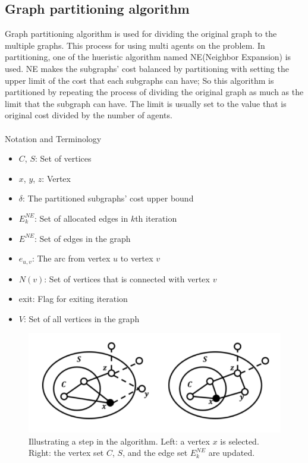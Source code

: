 \documentclass{article}
\begin{document}
\subsection{Graph partitioning algorithm}
Graph partitioning algorithm is used for dividing the original graph to the multiple graphs. This process for using multi agents on the problem. In partitioning, one of the hueristic algorithm named NE(Neighbor Expansion)\cite{66d1ad1e8f1c43b88f191328697d8711} is used. NE makes the subgraphs’ cost balanced by partitioning with setting the upper limit of the cost that each subgraphs can have; So this algorithm is partitioned by repeating the process of dividing the original graph as much as the limit that the subgraph can have. The limit is usually set to the value that is original cost divided by the number of agents.
\\
\\ Notation and Terminology
\begin{itemize}
    \item $C$, $S$: Set of vertices
    \item $x$, $y$, $z$: Vertex
    \item $\delta$: The partitioned subgraphs' cost upper bound
    \item $E^{NE}_k$: Set of allocated edges in $k$th iteration
    \item $E^{NE}$: Set of edges in the graph
    \item $e_{u,v}$: The arc from vertex $u$ to vertex $v$
    \item $N(v)$: Set of vertices that is connected with vertex $v$
    \item exit: Flag for exiting iteration
    
    \item $V$: Set of all vertices in the graph
\end{itemize}
\begin{figure}
\centering
    \includegraphics[width=\textwidth]{NE.png}
    \caption{Illustrating a step in the algorithm. Left: a vertex $x$ is selected. Right: the vertex set $C$, $S$, and the edge set $E^{NE}_k$ are updated. \cite{66d1ad1e8f1c43b88f191328697d8711}}
\end{figure}
\end{document}
